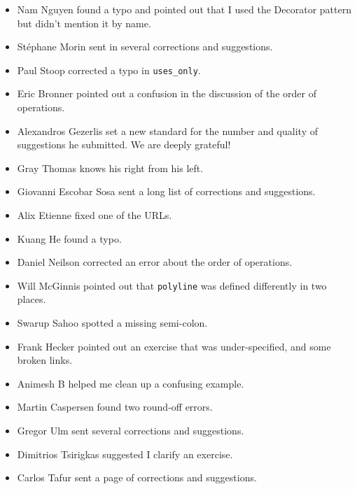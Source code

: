\documentclass[10pt]{book}
\begin{document}
\begin{CJK}{UTF8}{gbsn}
\begin{itemize}
\item Nam Nguyen found a typo and pointed out that I used the Decorator
pattern but didn't mention it by name.

\item St\'{e}phane Morin sent in several corrections and suggestions.

\item Paul Stoop corrected a typo in \verb+uses_only+.

\item Eric Bronner pointed out a confusion in the discussion of the
order of operations.

\item Alexandros Gezerlis set a new standard for the number and
quality of suggestions he submitted.  We are deeply grateful!

\item Gray Thomas knows his right from his left.

\item Giovanni Escobar Sosa sent a long list of corrections and
suggestions.

\item Alix Etienne fixed one of the URLs.

\item Kuang He found a typo.

\item Daniel Neilson corrected an error about the order of operations.

\item Will McGinnis pointed out that {\tt polyline} was defined
differently in two places.

\item Swarup Sahoo spotted a missing semi-colon.

\item Frank Hecker pointed out an exercise that was under-specified, and
some broken links.

\item Animesh B helped me clean up a confusing example.

\item Martin Caspersen found two round-off errors.

\item Gregor Ulm sent several corrections and suggestions.

\item Dimitrios Tsirigkas suggested I clarify an exercise.

\item Carlos Tafur sent a page of corrections and suggestions.


\end{itemize}
\end{CJK}
\end{document}

